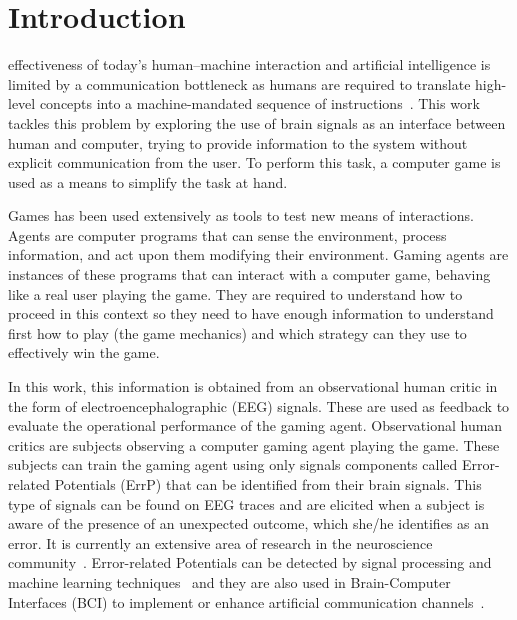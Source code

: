 \documentclass[journal]{IEEEtran}
\begin{document}
\section{Introduction}


 effectiveness of today's human–machine interaction and artificial intelligence is limited by a communication bottleneck as humans are required to translate high-level concepts into a machine-mandated sequence of instructions~\cite{CURSOR-CONTROL-PAPER}.   This work tackles this problem by exploring the use of brain signals as an interface between human and computer, trying to provide information to the system without explicit communication from the user.   To perform this task, a computer game is used as a means to simplify the task at hand.

Games has been used extensively as tools to test new means of interactions\cite{REF}.  Agents are computer programs that can sense the environment, process information, and act upon them modifying their environment.  Gaming agents are instances of these programs that can interact with a computer game, behaving like a real user playing the game.  They are required to understand how to proceed in this context so they need to have enough information to understand first how to play (the game mechanics) and which strategy can they use to effectively win the game. 

In this work, this information is obtained from an observational human critic in the form of electroencephalographic (EEG) signals.  These are used as feedback to evaluate the operational performance of the gaming agent.  Observational human critics are subjects observing a computer gaming agent playing the game. These subjects can train the gaming agent using only signals components called Error-related Potentials (ErrP) that can be identified from their brain signals.   This type of signals can be found on EEG traces and are elicited when a subject is aware of the presence of an unexpected outcome, which she/he identifies as an error.  It is currently an extensive area of research in the neuroscience community~\cite{Holroyd2009}.  Error-related Potentials can be detected by signal processing and machine learning techniques~\cite{EERP-PAPER} and they are also used in Brain-Computer Interfaces (BCI) to implement or enhance artificial communication channels~\cite{Chavarriaga2014}.
\end{document}
